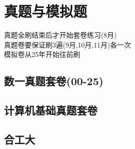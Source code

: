 \documentclass[12pt, a4paper, oneside, UTF8]{ctexbook}
\begin{document}
% 
\else
\fi
\chapter{真题与模拟题}
\begin{tcolorbox}
    真题全刷结束后才开始套卷练习(8月)\\
    真题卷要保证刷3遍(9月,10月,11月)各一次 \\
    模拟卷从25年开始往前刷
\end{tcolorbox}
\section{数一真题套卷(00-25)}
\section{计算机基础真题套卷}
\section{合工大}
\ifx\allfiles\undefined
\end{document}
